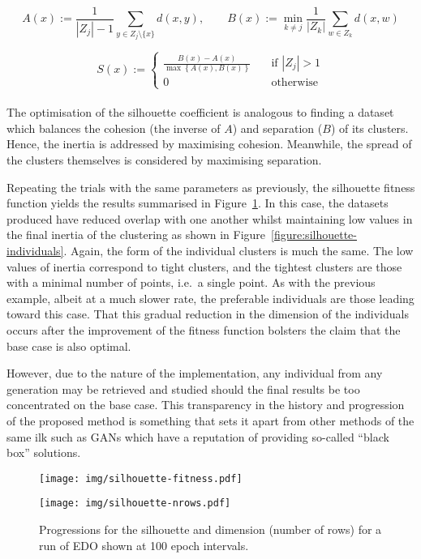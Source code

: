 \[
    A(x) := \frac{1}{|Z_j| - 1} \sum_{y \in Z_j \setminus \{x\}} d(x, y),
    \qquad B(x) := \min_{k \neq j} \frac{1}{|Z_k|} \sum_{w \in Z_k} d(x, w)
\]

\begin{equation}
        S(x) := 
            \begin{cases}
                \frac{B(x) - A(x)}{\max\left\{A(x), B(x)\right\}}
                &\quad \text{if } |Z_j| > 1\\
                0 &\quad \text{otherwise}
            \end{cases}\label{eq:silhouette}
\end{equation}\\

The optimisation of the silhouette coefficient is analogous to finding a dataset
which balances the cohesion (the inverse of \(A\)) and separation (\(B\)) of its
clusters. Hence, the inertia is addressed by maximising cohesion. Meanwhile, the
spread of the clusters themselves is considered by maximising separation.

Repeating the trials with the same parameters as previously, the silhouette
fitness function yields the results summarised in
Figure~\ref{figure:silhouette}. In this case, the datasets produced have reduced
overlap with one another whilst maintaining low values in the final inertia of
the clustering as shown in Figure~\ref{figure:silhouette-individuals}. Again,
the form of the individual clusters is much the same. The low values of inertia
correspond to tight clusters, and the tightest clusters are those with a minimal
number of points, i.e.\ a single point. As with the previous example, albeit at
a much slower rate, the preferable individuals are those leading toward this
case. That this gradual reduction in the dimension of the individuals occurs
after the improvement of the fitness function bolsters the claim that the base
case is also optimal.

However, due to the nature of the implementation, any individual from any
generation may be retrieved and studied should the final results be too
concentrated on the base case. This transparency in the history and progression
of the proposed method is something that sets it apart from other methods of the
same ilk such as GANs which have a reputation of providing so-called ``black
box'' solutions.

\begin{figure}[htbp]
    \centering
    \begin{minipage}{\imgwidth}
        \centering
        \texttt{[image: img/silhouette-fitness.pdf]}
    \end{minipage}

    \begin{minipage}{\imgwidth}
        \centering
        \texttt{[image: img/silhouette-nrows.pdf]}
    \end{minipage}
    \caption{Progressions for the silhouette and dimension (number of rows) for
             a run of EDO shown at 100 epoch
             intervals.}\label{figure:silhouette}
\end{figure}

